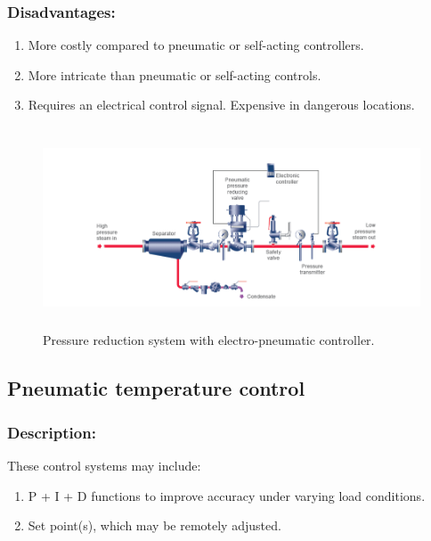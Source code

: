 \subsubsection{Disadvantages:}

\begin{enumerate}
\item
  More costly compared to pneumatic or self-acting controllers.
\item
  More intricate than pneumatic or self-acting controls.
\item
  Requires an electrical control signal. Expensive in dangerous
  locations.
\end{enumerate}

\begin{figure}[h!]
  \centering
  \includegraphics[width=5.60294in,height=2.3514in]{figs/control_instrumentation/image2.png}
  \caption{Pressure reduction system with electro-pneumatic controller.}
  \label{fig:Pressure reduction system with electro-pneumatic controller.}
\end{figure}


\subsection{Pneumatic temperature control}

\subsubsection{Description:}

These control systems may include:

\begin{enumerate}
\item
  P + I + D functions to improve accuracy under varying load conditions.
\item
  Set point(s), which may be remotely adjusted.
\end{enumerate}

